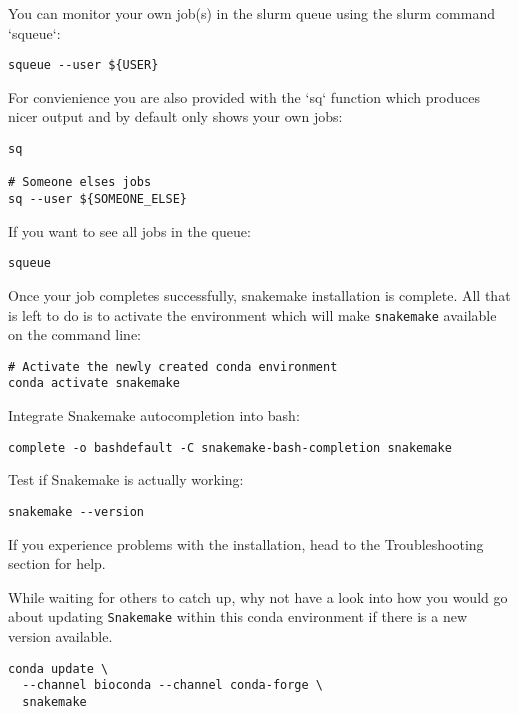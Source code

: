 \begin{note}

You can monitor your own job(s) in the slurm queue using the slurm command `squeue`:

\begin{lstlisting}
squeue --user ${USER}
\end{lstlisting}

For convienience you are also provided with the `sq` function which produces nicer output and by default only shows your own jobs:

\begin{lstlisting}
sq

# Someone elses jobs
sq --user ${SOMEONE_ELSE}
\end{lstlisting}

If you want to see all jobs in the queue:

\begin{lstlisting}
squeue
\end{lstlisting}

\end{note}

Once your job completes successfully, snakemake installation is complete. All that is left to do is to
activate the environment which will make \texttt{snakemake} available on the command line:

\begin{steps}

\begin{lstlisting}
# Activate the newly created conda environment
conda activate snakemake
\end{lstlisting}

Integrate Snakemake autocompletion into bash:

\begin{lstlisting}
complete -o bashdefault -C snakemake-bash-completion snakemake
\end{lstlisting}

Test if Snakemake is actually working:

\begin{lstlisting}
snakemake --version
\end{lstlisting}

\end{steps}

If you experience problems with the installation, head to the Troubleshooting section for help.

\begin{bonus}
While waiting for others to catch up, why not have a look into how you would go about updating \texttt{Snakemake}
within this conda environment if there is a new version available.

\begin{answer}
\begin{lstlisting}
conda update \
  --channel bioconda --channel conda-forge \
  snakemake
\end{lstlisting}
\end{answer}

\end{bonus}



